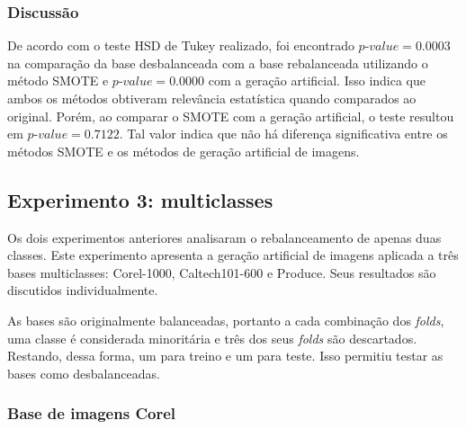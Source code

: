 \subsubsection*{Discussão}

De acordo com o teste HSD de Tukey realizado, foi encontrado $\textit{p-value} = 0.0003$ na comparação da base desbalanceada com a base rebalanceada utilizando o método SMOTE e $\textit{p-value} = 0.0000$ com a geração artificial. Isso indica que ambos os métodos obtiveram relevância estatística quando comparados ao original. Porém, ao comparar o SMOTE com a geração artificial, o teste resultou em $\textit{p-value} = 0.7122$. Tal valor indica que não há diferença significativa entre os métodos SMOTE e os métodos de geração artificial de imagens.

\subsection{Experimento 3: multiclasses}

Os dois experimentos anteriores analisaram o rebalanceamento de apenas duas classes. Este experimento apresenta a geração artificial de imagens aplicada a três bases multiclasses: Corel-1000, Caltech101-600 e Produce. Seus resultados são discutidos individualmente.

As bases são originalmente balanceadas, portanto a cada combinação dos \textit{folds}, uma classe é considerada minoritária e três dos seus \textit{folds} são descartados. Restando, dessa forma, um para treino e um para teste. Isso permitiu testar as bases como desbalanceadas.

\subsubsection{Base de imagens Corel}


